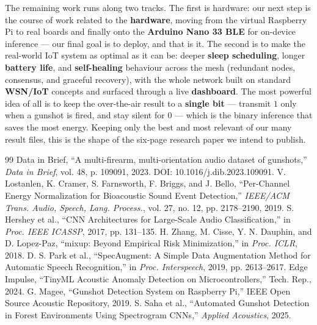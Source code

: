 \documentclass[conference]{IEEEtran}
\begin{document}
The remaining work runs along two tracks. The first is hardware: our next step is the course of work related
to the \textbf{hardware}, moving from the virtual Raspberry Pi to real boards and finally onto the
\textbf{Arduino Nano 33 BLE} for on-device inference --- our final goal is to deploy, and that is it. The
second is to make the real-world IoT system as optimal as it can be: deeper \textbf{sleep scheduling}, longer
\textbf{battery life}, and \textbf{self-healing} behaviour across the mesh (redundant nodes, consensus, and
graceful recovery), with the whole network built on standard \textbf{WSN/IoT} concepts and surfaced through a
live \textbf{dashboard}. The most powerful idea of all is to keep the over-the-air result to a \textbf{single
bit} --- transmit $1$ only when a gunshot is fired, and stay silent for $0$ --- which is the binary inference
that saves the most energy. Keeping only the best and most relevant of our many result files, this is the
shape of the six-page research paper we intend to publish.

\begin{thebibliography}{99}
 Data in Brief, ``A multi-firearm, multi-orientation audio dataset of gunshots,'' \textit{Data in Brief}, vol. 48, p. 109091, 2023. DOI: 10.1016/j.dib.2023.109091.
 V. Lostanlen, K. Cramer, S. Farnsworth, F. Briggs, and J. Bello, ``Per-Channel Energy Normalization for Bioacoustic Sound Event Detection,'' \textit{IEEE/ACM Trans. Audio, Speech, Lang. Process.}, vol. 27, no. 12, pp. 2178--2190, 2019.
 S. Hershey et al., ``CNN Architectures for Large-Scale Audio Classification,'' in \textit{Proc. IEEE ICASSP}, 2017, pp. 131--135.
 H. Zhang, M. Cisse, Y. N. Dauphin, and D. Lopez-Paz, ``mixup: Beyond Empirical Risk Minimization,'' in \textit{Proc. ICLR}, 2018.
 D. S. Park et al., ``SpecAugment: A Simple Data Augmentation Method for Automatic Speech Recognition,'' in \textit{Proc. Interspeech}, 2019, pp. 2613--2617.
 Edge Impulse, ``TinyML Acoustic Anomaly Detection on Microcontrollers,'' Tech. Rep., 2024.
 G. Magee, ``Gunshot Detection System on Raspberry Pi,'' IEEE Open Source Acoustic Repository, 2019.
 S. Saha et al., ``Automated Gunshot Detection in Forest Environments Using Spectrogram CNNs,'' \textit{Applied Acoustics}, 2025.
\end{thebibliography}
\end{document}
